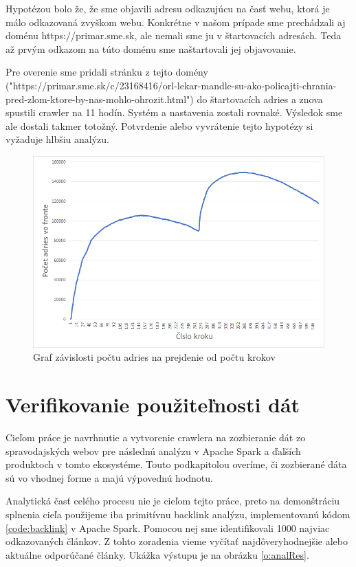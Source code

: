 Hypotézou bolo že, že sme objavili adresu odkazujúcu na časť webu, ktorá je málo odkazovaná zvyškom webu. Konkrétne v našom prípade sme prechádzali aj doménu https://primar.sme.sk, ale nemali sme ju v štartovacích adresách. Teda až prvým odkazom na túto doménu sme naštartovali jej objavovanie. 

Pre overenie sme pridali stránku z tejto domény ("https://primar.sme.sk/c/23168416/orl-lekar-mandle-su-ako-policajti-chrania-pred-zlom-ktore-by-nas-mohlo-ohrozit.html") do štartovacích adries a znova spustili crawler na 11 hodín. Systém a nastavenia zostali rovnaké. Výsledok sme ale dostali takmer totožný. Potvrdenie alebo vyvrátenie tejto hypotézy si vyžaduje hlbšiu analýzu.

\begin{figure}[!ht]
    \centering
    \includegraphics[width=.9\textwidth]{figures/umSizeChart.png}
    \caption{Graf závislosti počtu adries na prejdenie od počtu krokov\label{o:umSizeChart}}
\end{figure}





\section{Verifikovanie použiteľnosti dát}
Cieľom práce je navrhnutie a vytvorenie crawlera na zozbieranie dát zo spravodajských webov pre následnú analýzu v Apache Spark a ďalších produktoch v tomto ekosystéme. Touto podkapitolou overíme, či zozbierané dáta sú vo vhodnej forme a majú výpovednú hodnotu. 

Analytická časť celého procesu nie je cieľom tejto práce, preto na demonštráciu splnenia cieľa použijeme iba primitívnu backlink analýzu, implementovanú kódom \ref{code:backlink} v Apache Spark. Pomocou nej sme identifikovali 1000 najviac odkazovaných článkov. Z tohto zoradenia vieme vyčítať najdôveryhodnejšie alebo aktuálne odporúčané články. Ukážka výstupu je na obrázku \ref{o:analRes}.

